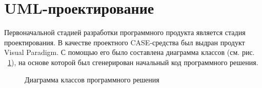 \section{UML-проектирование}

Первоначальной стадией разработки программного продукта является стадия проектирования.
В качестве проектного CASE-средства был выдран продукт Visual Paradigm.
С помощью его было составлена диаграмма классов (см. рис. ~\ref{ris:UML}), на основе которой был сгенерирован начальный код программного решения.

\begin{figure}[h]
\caption{Диаграмма классов программного решения}
\label{ris:UML}
\end{figure}